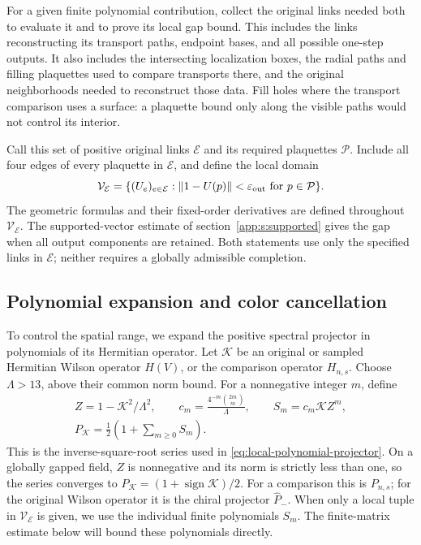 \documentclass[11pt,a4paper]{article}
\theoremstyle{remark}
\newcommand{\eps}{\varepsilon}
\begin{document}
For a given finite polynomial contribution, collect the original links
needed both to evaluate it and to prove its local gap bound. This
includes the links reconstructing its transport paths, endpoint bases,
and all possible one-step outputs. It also includes the intersecting
localization boxes, the radial paths and filling plaquettes used to
compare transports there, and the original neighborhoods needed to
reconstruct those data. Fill holes where the transport comparison uses
a surface: a plaquette bound only along the visible paths would not
control its interior.

Call this set of positive original links $\mathcal E$ and its required
plaquettes $\mathcal P$. Include all four edges of every plaquette
in $\mathcal E$, and define the local domain
\begin{equation}
 \mathcal V_{\mathcal E}
 =\{(U_e)_{e\in\mathcal E}:\|1-U(p)\|<\eps_{\rm out}
                                  \text{ for }p\in\mathcal P\}.
\end{equation}
The geometric formulas and their fixed-order derivatives are defined
throughout $\mathcal V_{\mathcal E}$. The supported-vector estimate
of section~\ref{app:s:supported} gives the gap when all output
components are retained. Both statements use only the specified links
in $\mathcal E$; neither requires a globally admissible completion.

\subsection{Polynomial expansion and color cancellation}

To control the spatial range, we expand the positive spectral projector
in polynomials of its Hermitian operator. Let $\mathcal K$ be an
original or sampled Hermitian Wilson operator $H(V)$, or the comparison
operator $H_{n,s}$. Choose $\Lambda>13$, above their common norm
bound. For a nonnegative integer $m$, define
\begin{equation}
 \begin{gathered}
 Z=1-\mathcal K^2/\Lambda^2,\qquad
 c_m=\frac{4^{-m}\binom{2m}{m}}{\Lambda},\qquad
 S_m=c_m\mathcal K Z^m,\\
 P_{\mathcal K}=\frac12\left(1+\sum_{m\ge0}S_m\right).
 \end{gathered}
 \label{app:a:series}
\end{equation}
This is the inverse-square-root series used in
\eqref{eq:local-polynomial-projector}. On a globally gapped field, $Z$ is nonnegative and its norm is
strictly less than one, so the series converges to
$P_{\mathcal K}=(1+\operatorname{sign}\mathcal K)/2$.
For a comparison this is $P_{n,s}$; for the original Wilson operator
it is the chiral projector $\widehat P_-$.
When only a local tuple in $\mathcal V_{\mathcal E}$ is given,
we use the individual finite polynomials $S_m$. The finite-matrix
estimate below will bound these polynomials directly.
\end{document}
